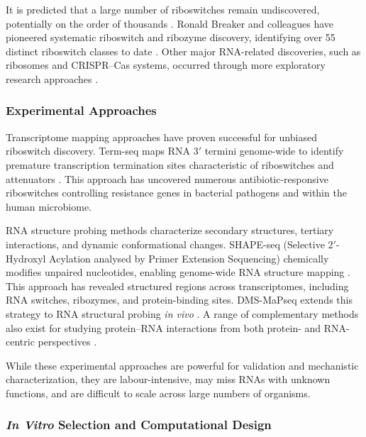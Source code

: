 \documentclass{article}
\begin{document}
It is predicted that a large number of riboswitches remain undiscovered, potentially on the order of thousands \parencite{Kavita2023}.
Ronald Breaker and colleagues have pioneered systematic riboswitch and ribozyme discovery, identifying over 55 distinct riboswitch classes to date \parencite{Breaker2022}.
Other major RNA-related discoveries, such as ribosomes and CRISPR--Cas systems, occurred through more exploratory research approaches \parencite{Brück2025}.

\subsubsection*{Experimental Approaches}

Transcriptome mapping approaches have proven successful for unbiased riboswitch discovery.
Term-seq maps RNA 3$'$ termini genome-wide to identify premature transcription termination sites characteristic of riboswitches and attenuators \parencite{Dar2016}.
This approach has uncovered numerous antibiotic-responsive riboswitches controlling resistance genes in bacterial pathogens and within the human microbiome.

RNA structure probing methods characterize secondary structures, tertiary interactions, and dynamic conformational changes.
SHAPE-seq (Selective 2$'$-Hydroxyl Acylation analysed by Primer Extension Sequencing) chemically modifies unpaired nucleotides, enabling genome-wide RNA structure mapping \parencite{Lucks2011}.
This approach has revealed structured regions across transcriptomes, including RNA switches, ribozymes, and protein-binding sites.
DMS-MaPseq extends this strategy to RNA structural probing \emph{in vivo} \parencite{Zubradt2017}.
A range of complementary methods also exist for studying protein--RNA interactions from both protein- and RNA-centric perspectives \parencite{Yi2025}.

While these experimental approaches are powerful for validation and mechanistic characterization, they are labour-intensive, may miss RNAs with unknown functions, and are difficult to scale across large numbers of organisms.

\subsubsection*{\emph{In Vitro} Selection and Computational Design}
\end{document}
